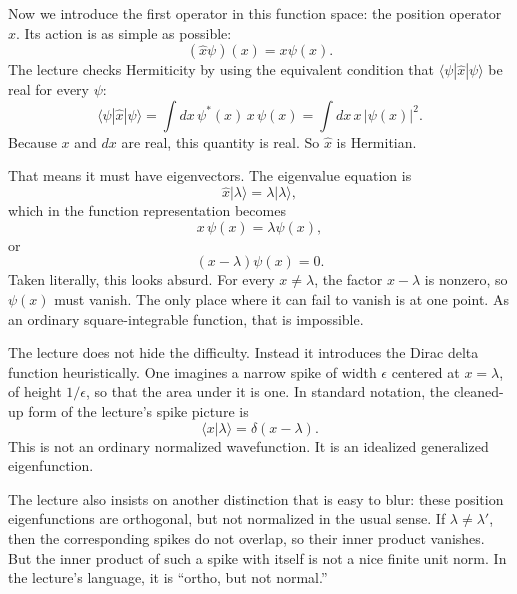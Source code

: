 Now we introduce the first operator in this function space: the position operator \(\hat x\). Its action is as simple as possible:
\begin{equation}
(\hat x\psi)(x)=x\psi(x).
\end{equation}
The lecture checks Hermiticity by using the equivalent condition that \(\langle \psi|\hat x|\psi\rangle\) be real for every \(\psi\):
\begin{equation}
\langle \psi|\hat x|\psi\rangle
=
\int dx\, \psi^*(x)\,x\,\psi(x)
=
\int dx\, x\,|\psi(x)|^2.
\end{equation}
Because \(x\) and \(dx\) are real, this quantity is real. So \(\hat x\) is Hermitian.

That means it must have eigenvectors. The eigenvalue equation is
\begin{equation}
\hat x|\lambda\rangle=\lambda|\lambda\rangle,
\end{equation}
which in the function representation becomes
\begin{equation}
x\,\psi(x)=\lambda \psi(x),
\end{equation}
or
\begin{equation}
(x-\lambda)\psi(x)=0.
\end{equation}
Taken literally, this looks absurd. For every \(x\neq \lambda\), the factor \(x-\lambda\) is nonzero, so \(\psi(x)\) must vanish. The only place where it can fail to vanish is at one point. As an ordinary square-integrable function, that is impossible.

The lecture does not hide the difficulty. Instead it introduces the Dirac delta function heuristically. One imagines a narrow spike of width \(\epsilon\) centered at \(x=\lambda\), of height \(1/\epsilon\), so that the area under it is one. In standard notation, the cleaned-up form of the lecture's spike picture is
\begin{equation}
\langle x|\lambda\rangle=\delta(x-\lambda).
\end{equation}
This is not an ordinary normalized wavefunction. It is an idealized generalized eigenfunction.

The lecture also insists on another distinction that is easy to blur: these position eigenfunctions are orthogonal, but not normalized in the usual sense. If \(\lambda\neq \lambda'\), then the corresponding spikes do not overlap, so their inner product vanishes. But the inner product of such a spike with itself is not a nice finite unit norm. In the lecture's language, it is ``ortho, but not normal.''


